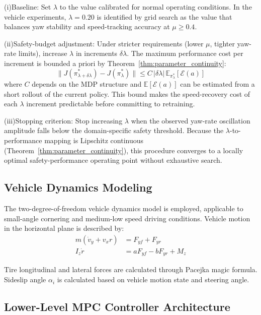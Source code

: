 \documentclass[journal]{IEEEtran}
\begin{document}
	(i)Baseline: Set $\lambda$ to the value calibrated for normal operating conditions. In the vehicle experiments, $\lambda=0.20$ is identified by grid search as the value that balances yaw stability and speed-tracking accuracy at $\mu\geq0.4$.
	
	(ii)Safety-budget adjustment: Under stricter requirements (lower $\mu$, tighter yaw-rate limits), increase $\lambda$ in increments $\delta\lambda$. The maximum performance cost per increment is bounded a priori by Theorem~\ref{thm:parameter_continuity}:
	\begin{equation}
		\|J(\pi^*_{\lambda+\delta\lambda}) - J(\pi^*_\lambda)\| \leq C\,|\delta\lambda|\,\mathbb{E}_{\pi^*_\lambda}[\mathcal{E}(a)]
		\label{eq:lambda_tradeoff}
	\end{equation}
	where $C$ depends on the MDP structure and $\mathbb{E}[\mathcal{E}(a)]$ can be estimated from a short rollout of the current policy. This bound makes the speed-recovery cost of each $\lambda$ increment predictable before committing to retraining.
	
	(iii)Stopping criterion: Stop increasing $\lambda$ when the observed yaw-rate oscillation amplitude falls below the domain-specific safety threshold. Because the $\lambda$-to-performance mapping is Lipschitz continuous (Theorem~\ref{thm:parameter_continuity}), this procedure converges to a locally optimal safety-performance operating point without exhaustive search.
	
	\subsection{Vehicle Dynamics Modeling}
	
	The two-degree-of-freedom vehicle dynamics model is employed, applicable to small-angle cornering and medium-low speed driving conditions. Vehicle motion in the horizontal plane is described by:
	\begin{equation}
		\begin{aligned}
			m(\dot{v}_y+v_xr) &= F_{yf} + F_{yr} \\
			I_z\dot{r} &= aF_{yf} - bF_{yr} + M_z
		\end{aligned}
		\label{eq:vehicle_dynamics}
	\end{equation}
	
	Tire longitudinal and lateral forces are calculated through Pacejka magic formula. Sideslip angle $\alpha_i$ is calculated based on vehicle motion state and steering angle.
	
	\subsection{Lower-Level MPC Controller Architecture}
	\label{sec:mpc_arch}
	
\end{document}
